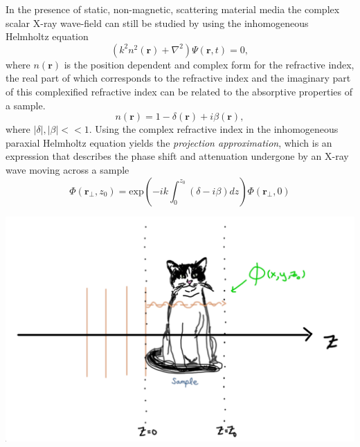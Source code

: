 \documentclass[10pt, a4paper, singlespacing]{report}
\newenvironment{Figure}
    {\par\medskip\noindent\minipage{\linewidth}}
    {\endminipage\par\medskip}
\begin{document}
In the presence of static, non-magnetic, scattering material media the complex scalar X-ray wave-field can still be studied by using the inhomogeneous Helmholtz equation 
\begin{equation}\label{eq:10}
\left ( k^2 n^2 (\mathbf{r}) + \nabla^{2}  \right )\Psi(\mathbf{r},t) = 0,
\end{equation}
where $n(\mathbf{r})$ is the position dependent and complex form for the refractive index, the real part of which corresponds to the refractive index and the imaginary part of this complexified refractive index can be related to the absorptive properties of a sample\cite{PagsTutes}.
\begin{equation}\label{eq:11}
n(\mathbf{r}) = 1 - \delta(\mathbf{r}) + i \beta(\mathbf{r}),
\end{equation}
where $|\delta|, |\beta| << 1$. Using the complex refractive index in the inhomogeneous paraxial Helmholtz equation yields the \textit{projection approximation}, which is an expression that describes the phase shift and attenuation undergone by an X-ray wave moving across a sample
\begin{equation}\label{eq:12}
\Phi(\mathbf{r}_{\perp}, z_0) = \mathrm{exp} \left ( -ik \int_{0}^{z_0}(\delta - i\beta)dz\right ) \Phi(\mathbf{r}_{\perp}, 0)
\end{equation}
\begin{Figure}
\centering
\includegraphics[width=0.6\linewidth]{projection_approximation.pdf}\label{fig:2}
\end{Figure}
\end{document}
